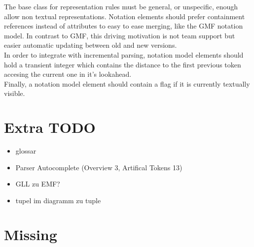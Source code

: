 The base class for representation rules must be general, or unspecific, enough allow non textual representations. Notation elements should prefer containment references instead of attributes to easy to ease merging, like the GMF notation model. In contrast to GMF, this driving motivation is not team support but easier automatic updating between old and new versions.\\
In order to integrate with incremental parsing, notation model elements should hold a transient integer which contains the distance to the first previous token accesing the current one in it's lookahead. \\
Finally, a notation model element should contain a flag if it is currently textually visible.





\section{Extra TODO}

\begin{itemize}
	\item glossar
	\item Parser Autocomplete (Overview 3, Artifical Tokens 13)
	\item GLL zu EMF?
	\item tupel im diagramm zu tuple
\end{itemize}

 


\section{Missing}

